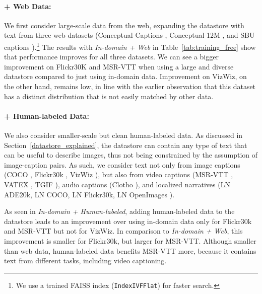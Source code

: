 \documentclass[10pt,twocolumn,letterpaper]{article}
\begin{document}
\paragraph{+ Web Data:} We first consider large-scale data from the web, expanding the datastore with text from three web datasets \cite{li2022blip} (Conceptual Captions \cite{sharma2018conceptual}, Conceptual 12M \cite{changpinyo2021conceptual}, and SBU captions \cite{ordonez2011im2text}).\footnote{We use a trained FAISS index (\texttt{IndexIVFFlat}) for faster search.} The results with \textit{In-domain + Web} in Table~\ref{tab:training_free} show that performance improves for all three datasets. We can see a bigger improvement on Flickr30K and MSR-VTT when using a large and diverse datastore compared to just using in-domain data. Improvement on VizWiz, on the other hand, remains low, in line with the earlier observation that this dataset has a distinct distribution that is not easily matched by other data.  

\paragraph{+ Human-labeled Data:} We also consider smaller-scale but clean human-labeled data. As discussed in Section~\ref{datastore_explained}, the datastore can contain any type of text that can be useful to describe images, thus not being constrained by the assumption of image-caption pairs. As such, we consider text not only from image captions (COCO \cite{chen2015microsoft}, Flickr30k \cite{young2014image}, VizWiz \cite{gurari2020captioning}), but also from video captions (MSR-VTT \cite{xu2016msr}, VATEX \cite{wang2019vatex}, TGIF \cite{li2016tgif}), audio captions (Clotho \cite{drossos2020clotho}), and localized narratives (LN ADE20k, LN COCO, LN Flickr30k, LN OpenImages \cite{pont2020connecting}). 

As seen in \textit{In-domain + Human-labeled}, adding human-labeled data to the datastore leads to an improvement over using in-domain data only for Flickr30k and MSR-VTT but not for VizWiz. In comparison to \textit{In-domain + Web}, this improvement is smaller for Flickr30k, but larger for MSR-VTT. 
Although smaller than web data, human-labeled data benefits MSR-VTT more, because it contains text from different tasks, including video captioning. 
\end{document}
